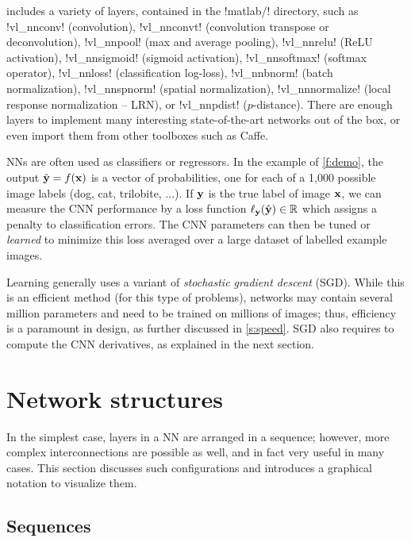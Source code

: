 \matconvnet includes a variety of layers, contained in the !matlab/! directory, such as !vl_nnconv! (convolution), !vl_nnconvt! (convolution transpose or deconvolution), !vl_nnpool! (max and average pooling), !vl_nnrelu! (ReLU activation), !vl_nnsigmoid! (sigmoid activation), !vl_nnsoftmax! (softmax operator), !vl_nnloss! (classification log-loss), !vl_nnbnorm! (batch normalization), !vl_nnspnorm! (spatial normalization), !vl_nnnormalize! (local response normalization -- LRN), or !vl_nnpdist! ($p$-distance).  There are enough layers to implement many interesting state-of-the-art networks out of the box, or even import them from other toolboxes such as Caffe. 

NNs are often used as classifiers or regressors. In the example of \cref{f:demo}, the output $\hat {\mathbf{y}} = f(\mathbf{x})$ is a vector of probabilities, one for each of a 1,000 possible image labels (dog, cat, trilobite, ...).  If $\mathbf{y}$ is the true label of image $\mathbf{x}$, we can measure the CNN performance by a loss function $\ell_{\mathbf{y}}(\hat {\mathbf{y}})  \in \mathbb{R}$ which assigns a penalty to classification errors. The CNN parameters can then be tuned or \emph{learned} to minimize this loss averaged over a large dataset of labelled example images.

Learning generally uses a variant of \emph{stochastic gradient descent} (SGD). While this is an efficient method (for this type of problems), networks may contain several million parameters and need to be trained on millions of images; thus, efficiency is a paramount in \matlab design, as further discussed in \cref{s:speed}. SGD also requires to compute the CNN derivatives, as explained in the next section.

\section{Network structures}\label{s:cnn-topology}

In the simplest case, layers in a NN are arranged in a sequence; however, more complex interconnections are possible as well, and in fact very useful in many cases. This section discusses such configurations and introduces a graphical notation to visualize them.

\subsection{Sequences}\label{s:cnn-simple}

